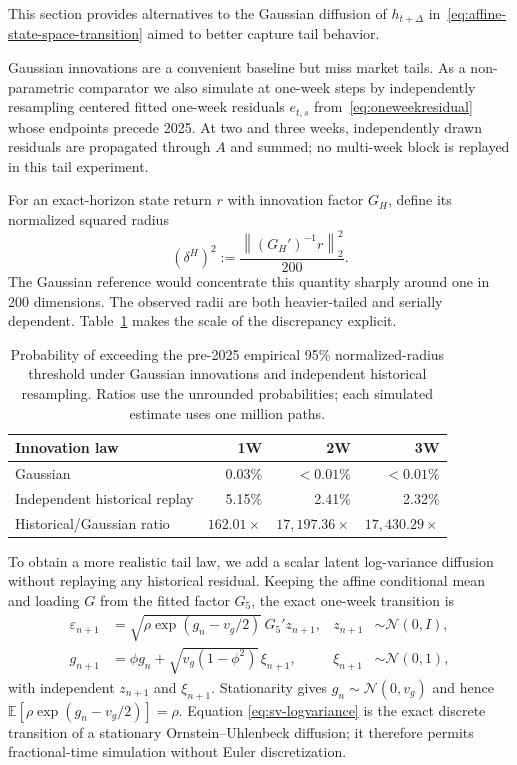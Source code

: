 \documentclass[11pt,a4paper]{article}
\newcommand{\E}{\mathbb{E}}
\begin{document}
This section provides alternatives to the Gaussian diffusion of $h_{t+\Delta}$
in~\eqref{eq:affine-state-space-transition} aimed to better capture tail behavior.

Gaussian innovations are a convenient baseline but miss market tails.  As a
non-parametric comparator we also simulate at one-week steps by independently
resampling centered fitted one-week residuals $e_{t,s}$ from~\eqref{eq:oneweekresidual} whose endpoints precede 2025.
At two and three weeks, independently drawn residuals are propagated through
$A$ and summed; no multi-week block is replayed in this tail experiment.

For an exact-horizon state return $r$ with innovation factor $G_H$,
define its normalized squared radius
\begin{equation}
  (\delta^H)^2:=\frac{\left\|(G_H')^{-1}r\right\|_2^2}{200}.
  \label{eq:radius}
\end{equation}
The Gaussian reference would concentrate this quantity sharply around one in
200 dimensions.  The observed radii are both heavier-tailed and serially
dependent.  Table~\ref{tab:gaussian-historical-tail-gap} makes the scale of
the discrepancy explicit.

\begin{table}[H]
\centering
\small
\begin{tabular}{lrrr}
\toprule
Innovation law & 1W & 2W & 3W\\
\midrule
Gaussian & 0.03\% & $<0.01\%$ & $<0.01\%$\\
Independent historical replay & 5.15\% & 2.41\% & 2.32\%\\
Historical/Gaussian ratio & $162.01\times$ & $17{,}197.36\times$
  & $17{,}430.29\times$\\
\bottomrule
\end{tabular}
\caption{Probability of exceeding the pre-2025 empirical 95\%
normalized-radius threshold under Gaussian innovations and independent
historical resampling.  Ratios use the unrounded probabilities; each simulated
estimate uses one million paths.}
\label{tab:gaussian-historical-tail-gap}
\end{table}

To obtain a more realistic tail law, we add a scalar latent log-variance
diffusion without replaying any historical residual.  Keeping the affine conditional mean and loading $G$
from the fitted factor $G_5$, the exact one-week transition is
\begin{align}
  \varepsilon_{n+1}
    &=\sqrt{\rho\exp(g_n-v_g/2)}\,G_5'z_{n+1},
      &z_{n+1}&\sim\mathcal N(0,I),\label{eq:sv-innovation}\\
  g_{n+1}
    &=\phi g_n+\sqrt{v_g(1-\phi^2)}\,\xi_{n+1},
      &\xi_{n+1}&\sim\mathcal N(0,1),\label{eq:sv-logvariance}
\end{align}
with independent $z_{n+1}$ and $\xi_{n+1}$.  Stationarity gives
$g_n\sim\mathcal N(0,v_g)$ and hence
$\E[\rho\exp(g_n-v_g/2)]=\rho$.  Equation
\eqref{eq:sv-logvariance} is the exact discrete transition of a stationary
Ornstein--Uhlenbeck diffusion; it therefore permits fractional-time simulation
without Euler discretization.
\end{document}
